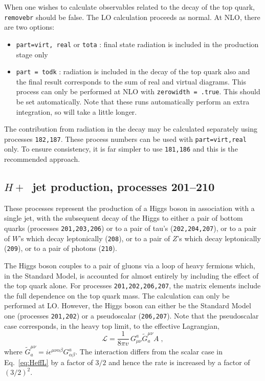 \documentclass[12pt]{article}
\begin{document}
When one wishes to calculate observables related to the decay of the top
quark, {\tt removebr} should be false.
The LO calculation proceeds as normal. At NLO, there are two options:
\begin{itemize}
\item {\tt part=virt, real} or {\tt tota} : final state radiation is included
in the production stage only
\item {\tt part = todk} : radiation is included in the decay of the top
quark also and the final result corresponds to the sum of real and virtual
diagrams. This process can only be performed at NLO with 
{\tt zerowidth = .true}. This should be set automatically.
Note that these runs automatically perform an extra integration, so
will take a little longer.
\end{itemize}

The contribution from radiation in the decay may be calculated separately using
processes {\tt 182,187}. These process numbers can be used with {\tt part=virt,real}
only. To ensure consistency, it is far simpler to use {\tt 181,186}
and this is the recommended approach.

\subsection{$H+$~jet production, processes 201--210}
\label{subsec:hjet}

These processes represent the production of a Higgs boson in association
with a single jet, with the subsequent decay of the Higgs to either
a pair of bottom quarks (processes {\tt 201,203,206}) 
or to a pair of tau's ({\tt 202,204,207}),
or to a pair of $W$'s which decay leptonically ({\tt 208}),
or to a pair of $Z$'s which decay leptonically ({\tt 209}),
or to a pair of photons ({\tt 210}).

The Higgs boson couples to a pair of gluons via a loop of heavy fermions
which, in the Standard Model, is accounted for almost entirely by including
the effect of the top quark alone. For processes {\tt 201,202,206,207}, the
matrix elements include the full dependence on the top quark mass.
The calculation can only be performed at LO. 
However, the Higgs boson can either be the Standard Model one
(processes {\tt 201,202}) or a pseudoscalar ({\tt 206,207}).
Note that the pseudoscalar case corresponds, in the heavy top limit, to the effective Lagrangian,
\begin{equation}
\mathcal{L} = \frac{1}{8\pi v} \, G^a_{\mu\nu} \widetilde G^{\mu\nu}_a A \;,
\end{equation}
where $\widetilde G^{\mu\nu}_a = i\epsilon^{\mu\nu\alpha\beta}
 G_{\alpha\beta}^a$.
The interaction differs from the scalar case in Eq.~{\ref{eq:HeffL}} by a factor of $3/2$
and hence the rate is increased by a factor of $(3/2)^2$.
\end{document}
